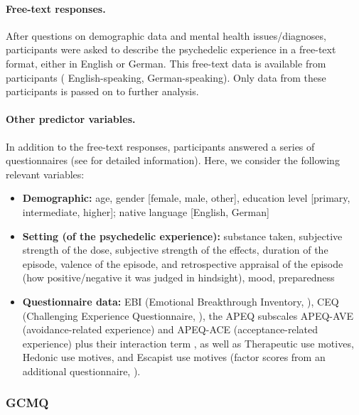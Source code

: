 \documentclass[man,floatsintext]{apa7}
\newcommand{\change}[1]{#1}
\begin{document}
\paragraph{Free-text responses.} After questions on demographic data and mental health issues/diagnoses, participants were asked to describe the psychedelic experience in a free-text format, either in English or German. This free-text data is available from  participants ( English-speaking,  German-speaking). Only data from these  participants is passed on to further analysis.

\paragraph{Other predictor variables.} In addition to the free-text responses, participants answered a series of questionnaires (see  \cite{wolff2022acceptance} for detailed information). Here, we consider the following relevant variables:
\begin{itemize}
    \item \textbf{Demographic:} age, gender [female, male, other], education level [primary, intermediate, higher]; native language [English, German]
    \item \textbf{Setting (of the psychedelic experience):} substance taken, subjective strength of the dose, \change{subjective strength of the effects}, duration of the episode, valence of the episode, \change{and retrospective appraisal of the episode (how positive/negative it was judged in hindsight)}, mood, preparedness
    \item \textbf{Questionnaire data:} EBI (Emotional Breakthrough Inventory, \cite{roseman2019emotional}), CEQ (Challenging Experience Questionnaire, \cite{barrett2016challenging,dworatzyk2022phenomenological}), the  APEQ \parencite{wolff2022acceptance} subscales     APEQ-AVE (avoidance-related experience) and APEQ-ACE (acceptance-related experience) \change{plus their interaction term \parencite{wolff2022acceptance}}, \change{as well as Therapeutic use motives, Hedonic use motives, and Escapist use motives (factor scores from an additional questionnaire, \cite{wolff2022acceptance}).} 
    
\end{itemize}


\subsubsection{GCMQ}
\end{document}
